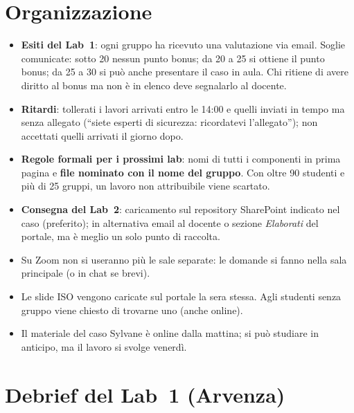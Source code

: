 \section{Organizzazione}
\begin{itemize}
  \item \textbf{Esiti del Lab~1}: ogni gruppo ha ricevuto una valutazione via email. Soglie
    comunicate: sotto 20 nessun punto bonus; da 20 a 25 si ottiene il punto bonus; da 25 a 30 si può
    anche presentare il caso in aula. Chi ritiene di avere diritto al bonus ma non è in elenco deve
    segnalarlo al docente.
  \item \textbf{Ritardi}: tollerati i lavori arrivati entro le 14:00 e quelli inviati in tempo ma
    senza allegato (``siete esperti di sicurezza: ricordatevi l'allegato''); non accettati quelli
    arrivati il giorno dopo.
  \item \textbf{Regole formali per i prossimi lab}: nomi di tutti i componenti in prima pagina e
    \textbf{file nominato con il nome del gruppo}. Con oltre 90 studenti e più di 25 gruppi, un lavoro
    non attribuibile viene scartato.
  \item \textbf{Consegna del Lab~2}: caricamento sul repository SharePoint indicato nel caso
    (preferito); in alternativa email al docente o sezione \emph{Elaborati} del portale, ma è meglio un
    solo punto di raccolta.
  \item Su Zoom non si useranno più le sale separate: le domande si fanno nella sala principale (o in
    chat se brevi).
  \item Le slide ISO vengono caricate sul portale la sera stessa. Agli studenti senza gruppo viene
    chiesto di trovarne uno (anche online).
  \item Il materiale del caso Sylvane è online dalla mattina; si può studiare in anticipo, ma il lavoro
    si svolge venerdì.
\end{itemize}

\section{Debrief del Lab~1 (Arvenza)}

